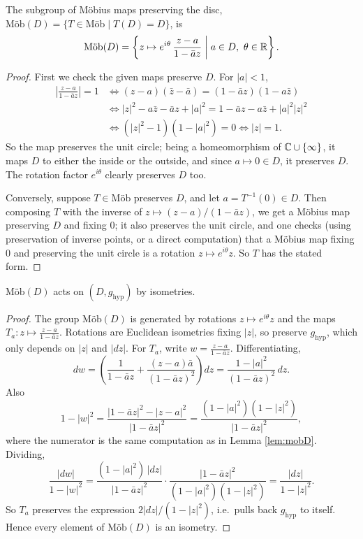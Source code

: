 \documentclass[a4paper]{scrartcl}
\newcommand{\Mob}{\text{M\"ob}}
\begin{document}
\begin{lemma}\label{lem:mobD}
    The subgroup of M\"obius maps preserving the disc, $\Mob(D) = \{T \in \Mob \mid T(D) = D\}$, is
    $$
    \Mob(D) = \left\{z \mapsto e^{i\theta}\, \frac{z - a}{1 - \bar{a} z} \;\middle|\; a \in D,\ \theta \in \R \right\}.
    $$
\end{lemma}
\begin{proof}
    First we check the given maps preserve $D$. For $|a| < 1$,
    \begin{align*}
        \left|\frac{z - a}{1 - \bar a z}\right| = 1 &\iff (z - a)(\bar z - \bar a) = (1 - \bar a z)(1 - a \bar z) \\
        &\iff |z|^2 - a \bar z - \bar a z + |a|^2 = 1 - \bar a z - a \bar z + |a|^2 |z|^2 \\
        &\iff (|z|^2 - 1)(1 - |a|^2) = 0 \iff |z| = 1.
    \end{align*}
    So the map preserves the unit circle; being a homeomorphism of $\mathbb{C} \cup \{\infty\}$, it maps $D$ to either the inside or the outside, and since $a \mapsto 0 \in D$, it preserves $D$. The rotation factor $e^{i\theta}$ clearly preserves $D$ too.

    Conversely, suppose $T \in \Mob$ preserves $D$, and let $a = T^{-1}(0) \in D$. Then composing $T$ with the inverse of $z \mapsto (z - a)/(1 - \bar a z)$, we get a M\"obius map preserving $D$ and fixing $0$; it also preserves the unit circle, and one checks (using preservation of inverse points, or a direct computation) that a M\"obius map fixing $0$ and preserving the unit circle is a rotation $z \mapsto e^{i\theta} z$. So $T$ has the stated form.
\end{proof}

\begin{lemma}\label{lem:mobisometry}
    $\Mob(D)$ acts on $(D, g_{\mathrm{hyp}})$ by isometries.
\end{lemma}
\begin{proof}
    The group $\Mob(D)$ is generated by rotations $z \mapsto e^{i\theta} z$ and the maps $T_a: z \mapsto \frac{z-a}{1 - \bar a z}$. Rotations are Euclidean isometries fixing $|z|$, so preserve $g_{\mathrm{hyp}}$, which only depends on $|z|$ and $|dz|$.
    For $T_a$, write $w = \frac{z - a}{1 - \bar a z}$. Differentiating,
    $$
    dw = \left(\frac{1}{1 - \bar a z} + \frac{(z - a)\bar a}{(1 - \bar a z)^2}\right) dz = \frac{1 - |a|^2}{(1 - \bar a z)^2}\, dz.
    $$
    Also
    $$
    1 - |w|^2 = \frac{|1 - \bar a z|^2 - |z - a|^2}{|1 - \bar a z|^2} = \frac{(1 - |a|^2)(1 - |z|^2)}{|1 - \bar a z|^2},
    $$
    where the numerator is the same computation as in Lemma \ref{lem:mobD}. Dividing,
    $$
    \frac{|dw|}{1 - |w|^2} = \frac{(1 - |a|^2)\,|dz|}{|1 - \bar a z|^2} \cdot \frac{|1 - \bar a z|^2}{(1 - |a|^2)(1 - |z|^2)} = \frac{|dz|}{1 - |z|^2}.
    $$
    So $T_a$ preserves the expression $2|dz|/(1 - |z|^2)$, i.e.\ pulls back $g_{\mathrm{hyp}}$ to itself. Hence every element of $\Mob(D)$ is an isometry.
\end{proof}
\end{document}
